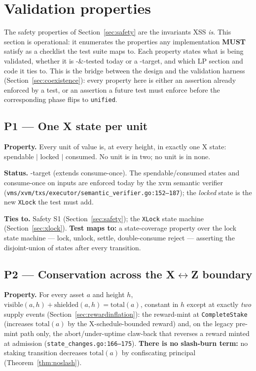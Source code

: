 \section{Validation properties}
\label{sec:validation}

The safety properties of Section~\ref{sec:safety} are the invariants XSS
\emph{is}. This section is operational: it enumerates the properties any
implementation \textbf{MUST} satisfy as a checklist the test suite maps
to. Each property states what is being validated, whether it is
\IMPL{}-\&-tested today or a \DESIGN{}-target, and which LP section and
code it ties to. This is the bridge between the design and the
validation harness (Section~\ref{sec:coexistence}): every property here
is either an assertion already enforced by a test, or an assertion a
future test must enforce before the corresponding phase flips to
\texttt{unified}.

\subsection*{P1 --- One X state per unit}

\textbf{Property.} Every unit of value is, at every height, in exactly
one X state: spendable $\mid$ locked $\mid$ consumed. No unit is in two;
no unit is in none.

\textbf{Status.} \DESIGN{}-target (extends \IMPL{} consume-once). The
spendable/consumed states and consume-once on inputs are enforced today
by the xvm semantic verifier
(\texttt{vms/xvm/txs/executor/\allowbreak semantic\_verifier.go:152--187});
the \emph{locked} state is the new \texttt{XLock} the test must add.

\textbf{Ties to.} Safety S1 (Section~\ref{sec:safety}); the \texttt{XLock}
state machine (Section~\ref{sec:xlock}). \textbf{Test maps to:} a
state-coverage property over the lock state machine --- lock, unlock,
settle, double-consume reject --- asserting the disjoint-union of states
after every transition.

\subsection*{P2 --- Conservation across the X$\leftrightarrow$Z boundary}

\textbf{Property.} For every asset $a$ and height $h$,
$\mathrm{visible}(a,h) + \mathrm{shielded}(a,h) = \mathrm{total}(a)$,
constant in $h$ except at exactly \emph{two} supply events
(Section~\ref{sec:rewardinflation}): the reward-mint at
\texttt{CompleteStake} (increases $\mathrm{total}(a)$ by the
X-schedule-bounded reward) and, on the legacy pre-mint path only, the
abort/under-uptime claw-back that reverses a reward minted at admission
(\texttt{state\_changes.go:166--175}). \textbf{There is no slash-burn
term:} no staking transition decreases $\mathrm{total}(a)$ by confiscating
principal (Theorem~\ref{thm:noslash}).

